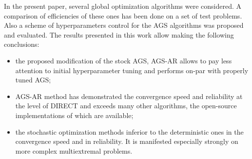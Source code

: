 In the present paper, several global optimization algorithms were considered.
A comparison of efficiencies of these ones has been done on a set of test problems.
Also a scheme of hyperparameters control for the AGS algorithms was proposed and evaluated.
The results presented in this work allow making the following conclusions:
\begin{itemize}
  \item the proposed modification of the stock AGS, AGS-AR allows to pay less attention to initial hyperparameter tuning and
  performs on-par with properly tuned AGS;
  \item AGS-AR method has demonstrated the convergence
  speed and reliability at the level of DIRECT and exceeds many other algorithms, the open-source
  implementations of which are available;
  \item the stochastic optimization methods inferior to the deterministic ones in the convergence
speed and in reliability. It is manifested especially strongly on more complex multiextremal
problems.
\end{itemize}
